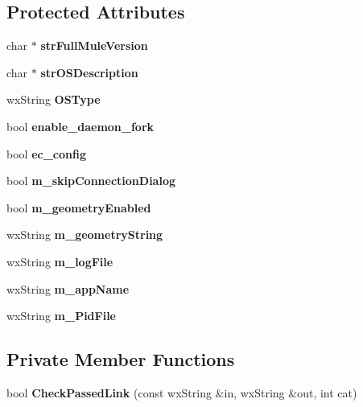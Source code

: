 \subsection*{Protected Attributes}
\begin{DoxyCompactItemize}
\item 
char $\ast$ {\bfseries strFullMuleVersion}\label{classCamuleAppCommon_a8a80601b3677575bcc908146c13069f9}

\item 
char $\ast$ {\bfseries strOSDescription}\label{classCamuleAppCommon_a639c9e1a9f1aeeeaf10fb93031fd1f85}

\item 
wxString {\bfseries OSType}\label{classCamuleAppCommon_a1a399539d14f9a426ddba7ce2b85c844}

\item 
bool {\bfseries enable\_\-daemon\_\-fork}\label{classCamuleAppCommon_ab6ffbc634b00168221884c3e0a74a530}

\item 
bool {\bfseries ec\_\-config}\label{classCamuleAppCommon_abcddf52662437b7d7ae8ba320bbcfad4}

\item 
bool {\bfseries m\_\-skipConnectionDialog}\label{classCamuleAppCommon_a72b1335960550c6229fac0d240644850}

\item 
bool {\bfseries m\_\-geometryEnabled}\label{classCamuleAppCommon_a33d19f32d84b454c498f59ad3146896a}

\item 
wxString {\bfseries m\_\-geometryString}\label{classCamuleAppCommon_ad581268cb21ed78e7637a5c5dda76a3c}

\item 
wxString {\bfseries m\_\-logFile}\label{classCamuleAppCommon_ab45b3e4105e4f107355df88074d8d72d}

\item 
wxString {\bfseries m\_\-appName}\label{classCamuleAppCommon_a447e74801843f7bf23cc3f64038760b6}

\item 
wxString {\bfseries m\_\-PidFile}\label{classCamuleAppCommon_a34411995ed3e78da09c1a934b35a8bba}

\end{DoxyCompactItemize}
\subsection*{Private Member Functions}
\begin{DoxyCompactItemize}
\item 
bool {\bfseries CheckPassedLink} (const wxString \&in, wxString \&out, int cat)\label{classCamuleAppCommon_ac24c47aa6ed56eafbe2d5b7c9123014c}

\end{DoxyCompactItemize}
